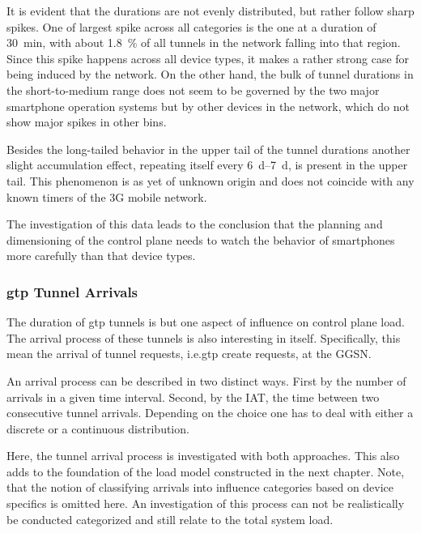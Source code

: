 It is evident that the durations are not evenly distributed, but rather follow sharp spikes. One of largest spike across all categories is the one at a duration of \SI{30}{\minute}, with about \SI{1.8}{\percent} of all tunnels in the network falling into that region. Since this spike happens across all device types, it makes a rather strong case for being induced by the network. On the other hand, the bulk of tunnel durations in the short-to-medium range does not seem to be governed by the two major smartphone operation systems but by other devices in the network, which do not show major spikes in other bins.

Besides the long-tailed behavior in the upper tail of the tunnel durations another slight accumulation effect, repeating itself every \SIrange{6}{7}{\day}, is present in the upper tail. This phenomenon is as yet of unknown origin and does not coincide with any known timers of the \gls{3G} mobile network.

The investigation of this data leads to the conclusion that the planning and dimensioning of the control plane needs to watch the behavior of smartphones more carefully than that device types.


\subsubsection{\texorpdfstring{\acrshort{gtp}}{GTP} Tunnel Arrivals}

The duration of \gls{gtp} tunnels is but one aspect of influence on control plane load. The arrival process of these tunnels is also interesting in itself. Specifically, this mean the arrival of tunnel requests, i.e.\gls{gtp} create requests, at the \gls{GGSN}. 

An arrival process can be described in two distinct ways. First by the number of arrivals in a given time interval. Second, by the \gls{IAT}, the time between two consecutive tunnel arrivals. Depending on the choice one has to deal with either a discrete or a continuous distribution.

Here, the tunnel arrival process is investigated with both approaches. This also adds to the foundation of the load model constructed in the next chapter. Note, that the notion of classifying arrivals into influence categories based on device specifics is omitted here. An investigation of this process can not be realistically be conducted categorized and still relate to the total system load.

